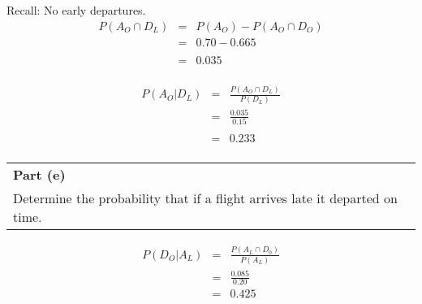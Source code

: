 \documentclass[a4paper,12pt]{article}
\begin{document}
\noindent Recall: No early departures.
\\

\begin{eqnarray*}
P(A_{O} \cap D_{L}) &=& P(A_{O}) - P(A_{O} \cap D_{O}) \\
&=& 0.70 - 0.665\\
& & \\
&=& 0.035\\
\end{eqnarray*} 


\begin{eqnarray*}
P(A_{O} | D_{L}) &=& \frac{P(A_{O} \cap D_{L})}{P(D_L)}   \\
&=& \frac{0.035}{0.15}\\
& & \\
&=& 0.233\\
\end{eqnarray*}


\newpage

\begin{table}[ht!]
 \centering
 \begin{tabular}{|p{15cm}|}
 \hline  \large \smallskip
\noindent \textbf{Part (e)} \\ \large \smallskip  
 Determine the probability that if a flight arrives late it departed on time. 

 \\ \hline
  \end{tabular}
\end{table}






 


\begin{eqnarray*}
P(D_{O} | A_{L}) &=& \frac{P(A_{L} \cap D_{0})}{P(A_L)}   \\
&=& \frac{0.085}{0.20}\\
&=& 0.425\\
\end{eqnarray*} 


\end{document}
